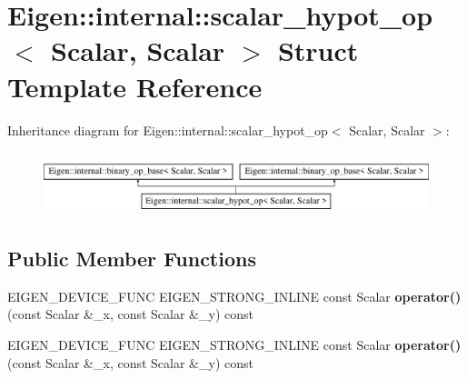 \hypertarget{struct_eigen_1_1internal_1_1scalar__hypot__op_3_01_scalar_00_01_scalar_01_4}{}\section{Eigen\+:\+:internal\+:\+:scalar\+\_\+hypot\+\_\+op$<$ Scalar, Scalar $>$ Struct Template Reference}
\label{struct_eigen_1_1internal_1_1scalar__hypot__op_3_01_scalar_00_01_scalar_01_4}
Inheritance diagram for Eigen\+:\+:internal\+:\+:scalar\+\_\+hypot\+\_\+op$<$ Scalar, Scalar $>$\+:\begin{figure}[H]
\begin{center}
\leavevmode
\includegraphics[height=1.824104cm]{struct_eigen_1_1internal_1_1scalar__hypot__op_3_01_scalar_00_01_scalar_01_4}
\end{center}
\end{figure}
\subsection*{Public Member Functions}
\begin{DoxyCompactItemize}
\item 
\mbox{\label{struct_eigen_1_1internal_1_1scalar__hypot__op_3_01_scalar_00_01_scalar_01_4_a0c3719d26869a8c0b2febff0dc0e95f4}} 
E\+I\+G\+E\+N\+\_\+\+D\+E\+V\+I\+C\+E\+\_\+\+F\+U\+NC E\+I\+G\+E\+N\+\_\+\+S\+T\+R\+O\+N\+G\+\_\+\+I\+N\+L\+I\+NE const Scalar {\bfseries operator()} (const Scalar \&\+\_\+x, const Scalar \&\+\_\+y) const
\item 
\mbox{\label{struct_eigen_1_1internal_1_1scalar__hypot__op_3_01_scalar_00_01_scalar_01_4_a0c3719d26869a8c0b2febff0dc0e95f4}} 
E\+I\+G\+E\+N\+\_\+\+D\+E\+V\+I\+C\+E\+\_\+\+F\+U\+NC E\+I\+G\+E\+N\+\_\+\+S\+T\+R\+O\+N\+G\+\_\+\+I\+N\+L\+I\+NE const Scalar {\bfseries operator()} (const Scalar \&\+\_\+x, const Scalar \&\+\_\+y) const
\end{DoxyCompactItemize}
